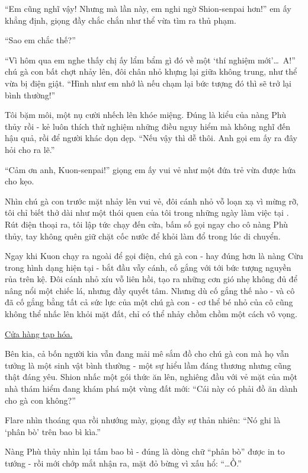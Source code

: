 \documentclass[../main.tex]{subfiles}
\begin{document}
``Em cũng nghĩ vậy! Nhưng mà lần này, em nghi ngờ Shion-senpai hơn!'' em ấy khẳng định, giọng đầy chắc chắn như thể vừa tìm ra thủ phạm.

``Sao em chắc thế?''

``Vì hôm qua em nghe thấy chị ấy lẩm bẩm gì đó về một `thí nghiệm mới'\dots\ A!'' chú gà con bất chợt nhảy lên, đôi chân nhỏ khựng lại giữa không trung, như thể vừa bị điện giật. ``Hình như em nhớ là nếu chạm lại bức tượng đó thì sẽ trở lại bình thường!''

Tôi bặm môi, một nụ cười nhếch lên khóe miệng. Đúng là kiểu của nàng Phù thủy rồi - kẻ luôn thích thử nghiệm những điều nguy hiểm mà không nghĩ đến hậu quả, rồi để người khác dọn dẹp. ``Nếu vậy thì dễ thôi. Anh gọi em ấy ra đây hỏi cho ra lẽ.''

``Cảm ơn anh, Kuon-senpai!'' giọng em ấy vui vẻ như một đứa trẻ vừa được hứa cho kẹo.

Nhìn chú gà con trước mặt nhảy lên vui vẻ, đôi cánh nhỏ vỗ loạn xạ vì mừng rỡ, tôi chỉ biết thở dài như một thói quen của tôi trong những ngày làm việc tại \hll. Rút điện thoại ra, tôi lập tức chạy đến cửa, bấm số gọi ngay cho cô nàng Phù thủy, tay không quên giữ chặt cốc nước để khỏi làm đổ trong lúc di chuyển.

Ngay khi Kuon chạy ra ngoài để gọi điện, chú gà con - hay đúng hơn là nàng Cừu trong hình dạng hiện tại - bắt đầu vẫy cánh, cố gắng với tới bức tượng nguyền rủa trên kệ. Đôi cánh nhỏ xíu vỗ liên hồi, tạo ra những cơn gió nhẹ không đủ để nâng nổi một chiếc lá, nhưng đầy quyết tâm. Nhưng dù cố gắng thế nào - và cô đã cố gắng bằng tất cả sức lực của một chú gà con - cơ thể bé nhỏ của cô cũng không thể nhấc lên khỏi mặt đất, chỉ có thể nhảy chồm chồm một cách vô vọng.

\begin{center}
  \uline{Cửa hàng tạp hóa.}
\end{center}

Bên kia, cả bốn người kia vẫn đang mải mê sắm đồ cho chú gà con mà họ vẫn tưởng là một sinh vật bình thường - một sự hiểu lầm đáng thương nhưng cũng thật đáng yêu. Shion nhấc một gói thức ăn lên, nghiêng đầu với vẻ mặt của một nhà thám hiểm đang khám phá một vùng đất mới: ``Cái này có phải đồ ăn dành cho gà con không?''


Flare nhìn thoáng qua rồi nhướng mày, giọng đầy sự thản nhiên: ``Nó ghi là `phân bò' trên bao bì kìa.''

Nàng Phù thủy nhìn lại tấm bao bì - đúng là dòng chữ ``phân bò'' được in to tướng - rồi mới chớp mắt nhận ra, mặt đỏ bừng vì xấu hổ: ``\dots Ồ.''
\end{document}

